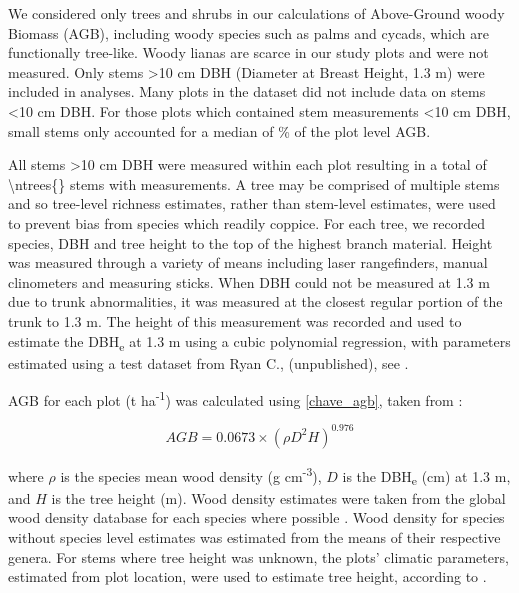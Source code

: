 \documentclass[11pt,a4paper]{article}
\begin{document}
We considered only trees and shrubs in our calculations of Above-Ground woody Biomass (AGB), including woody species such as palms and cycads, which are functionally tree-like. Woody lianas are scarce in our study plots and were not measured. Only stems >10 cm DBH (Diameter at Breast Height, 1.3 m) were included in analyses. Many plots in the dataset did not include data on stems <10 cm DBH. For those plots which contained stem measurements <10 cm DBH, small stems only accounted for a median of \percsmallagb{}\% of the plot level AGB. 

All stems >10 cm DBH were measured within each plot resulting in a total of \num[group-separator={,}]{\ntrees{}} stems with measurements. A tree may be comprised of multiple stems and so tree-level richness estimates, rather than stem-level estimates, were used to prevent bias from species which readily coppice. For each tree, we recorded species, DBH and tree height to the top of the highest branch material. Height was measured through a variety of means including laser rangefinders, manual clinometers and measuring sticks. When DBH could not be measured at 1.3 m due to trunk abnormalities, it was measured at the closest regular portion of the trunk to 1.3 m. The height of this measurement was recorded and used to estimate the DBH\textsubscript{e} at 1.3 m using a cubic polynomial regression, with parameters estimated using a test dataset from Ryan C., (unpublished), see \citet{Godlee2020}.

AGB for each plot (t ha\textsuperscript{-1}) was calculated using \autoref{chave_agb}, taken from \citet{Chave2014}:

\begin{equation}
	AGB = 0.0673 \times (\rho D^{2} H)^{0.976}
	\label{chave_agb}
\end{equation}

where $\rho$ is the species mean wood density (g cm\textsuperscript{-3}), $D$ is the DBH\textsubscript{e} (cm) at 1.3 m, and $H$ is the tree height (m). Wood density estimates were taken from the global wood density database for each species where possible \citep{Chave2009, Zanne2009}. Wood density for species without species level estimates was estimated from the means of their respective genera. For stems where tree height was unknown, the plots' climatic parameters, estimated from plot location, were used to estimate tree height, according to \citet{Chave2014}.
\end{document}
